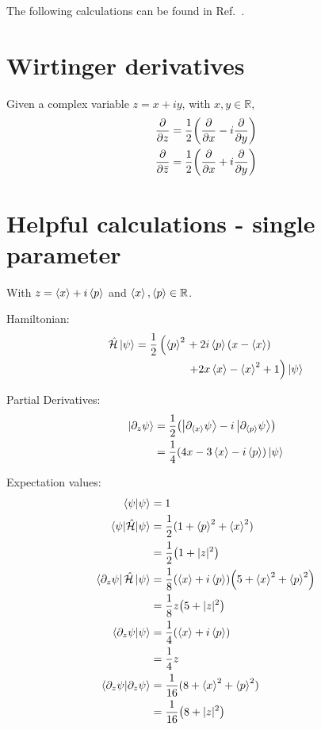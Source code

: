 \documentclass[aps,pre,superscriptaddress,amsmath,amssymb,amsfonts,twocolumn,showpacs,notitlepage]{revtex4-1}
\begin{document}
\clearpage
\appendix
The following calculations can be found in Ref.~\cite{GASP}.
\section{Wirtinger derivatives}
	Given a complex variable $z = x + iy$, with $x,y\in\mathbb{R}$,
	\begin{align}
		\frac{\partial}{\partial z} &= \frac{1}{2}\qty(\frac{\partial}{\partial x} - i\frac{\partial}{\partial y})
		\\
		\frac{\partial}{\partial \bar{z}} &= \frac{1}{2}\qty(\frac{\partial}{\partial x} + i\frac{\partial}{\partial y})
	\end{align}

\section{Helpful calculations - single parameter} \label{app:help}
	With $z = \ev{x} + i\ev{p}$ and  $\ev{x},\ev{p}\in\mathbb{R}$.
	
	Hamiltonian:
	\begin{align}		
		\hat{\mathcal{H}}\ket{\psi} = \frac{1}{2}\left(\ev{p}^2\right.
		&+2 i \ev{p} (x-\ev{x}) \nonumber \\
		&\left.+2 x \ev{x}-\ev{x}^2+1\right)\ket{\psi}		
	\end{align}		
	
	Partial Derivatives:
	\begin{align}
		\ket{\partial_{z}\psi} &= \frac{1}{2}\qty(\ket{\partial_{\ev{x}}\psi} -i\ket{\partial_{\ev{p}}\psi}) \nonumber \\
		&= \frac{1}{4}\qty(4x - 3\ev{x} - i\ev{p})\ket{\psi}
	\end{align}
	
	Expectation values:
	\begin{align}
		\braket{\psi}{\psi} &= 1
		\\		
		\ev{\hat{\mathcal{H}}}{\psi} &= \frac{1}{2}(1+\ev{p}^2+\ev{x}^2) \nonumber \\
		&= \frac{1}{2}\qty(1+|z|^2)
		\\
		\bra{\partial_{z}\psi}\hat{\mathcal{H}}\ket{\psi} &= \frac{1}{8}\qty(\ev{x}+i\ev{p})\qty(5+\ev{x}^2+\ev{p}^2) \nonumber \\
		&= \frac{1}{8}z\qty(5+|z|^2)
		\\
		\braket{\partial_{z}\psi}{\psi} &= \frac{1}{4}(\ev{x} + i\ev{p}) \nonumber \\
		&= \frac{1}{4}z
		\\
		\braket{\partial_{z}\psi}{\partial_{z}\psi} &= \frac{1}{16}(8+\ev{x}^2+\ev{p}^2)\nonumber \\
		& = \frac{1}{16}\qty(8+|z|^2)
	\end{align}
	
\end{document}
